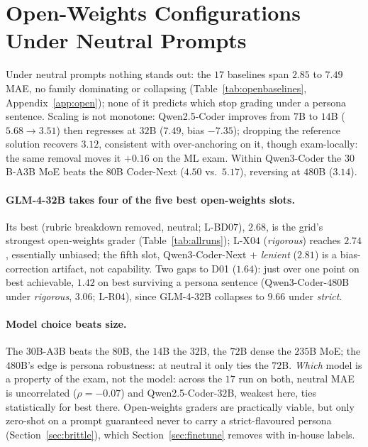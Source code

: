 \section{Open-Weights Configurations Under Neutral Prompts}
\label{sec:open}

Under neutral prompts nothing stands out: the $17$ baselines span $2.85$ to $7.49$ MAE, no family dominating or collapsing (Table~\ref{tab:openbaselines}, Appendix~\ref{app:open}); none of it predicts which stop grading under a persona sentence. Scaling is not monotone: Qwen2.5-Coder improves from $7$B to $14$B ($5.68\to3.51$) then regresses at $32$B ($7.49$, bias $-7.35$); dropping the reference solution recovers $3.12$, consistent with over-anchoring on it, though exam-locally: the same removal moves it $+0.16$ on the ML exam. Within Qwen3-Coder the $30$B-A$3$B MoE beats the $80$B Coder-Next ($4.50$ vs.\ $5.17$), reversing at $480$B ($3.14$).

\paragraph{GLM-4-32B takes four of the five best open-weights slots.}
Its best (rubric breakdown removed, neutral; L-BD$07$), $2.68$, is the grid's strongest open-weights grader (Table~\ref{tab:allruns}); L-X$04$ (\emph{rigorous}) reaches $2.74$, essentially unbiased; the fifth slot, Qwen3-Coder-Next $+$ \emph{lenient} ($2.81$) is a bias-correction artifact, not capability. Two gaps to D01 ($1.64$): just over one point on best achievable, $1.42$ on best surviving a persona sentence (Qwen3-Coder-$480$B under \emph{rigorous}, $3.06$; L-R$04$), since GLM-4-32B collapses to $9.66$ under \emph{strict}.

\paragraph{Model choice beats size.}
The $30$B-A$3$B beats the $80$B, the $14$B the $32$B, the $72$B dense the $235$B MoE; the $480$B's edge is persona robustness: at neutral it only ties the $72$B. \emph{Which} model is a property of the exam, not the model: across the $17$ run on both, neutral MAE is uncorrelated ($\rho=-0.07$) and Qwen2.5-Coder-$32$B, weakest here, ties statistically for best there. Open-weights graders are practically viable, but only zero-shot on a prompt guaranteed never to carry a strict-flavoured persona (Section~\ref{sec:brittle}), which Section~\ref{sec:finetune} removes with in-house labels.
